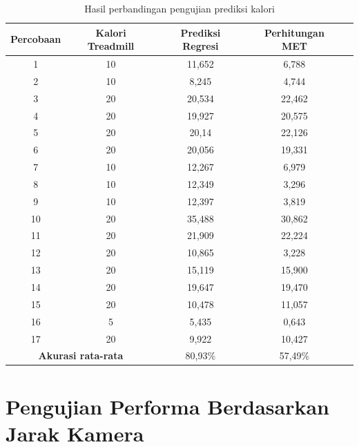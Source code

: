 \begin{longtable}{|c|c|c|c|c|}
  \caption{Hasil perbandingan pengujian prediksi kalori}
  \label{tb:PengujianPrediksi}                                   \\
  \hline
  \rowcolor[HTML]{C0C0C0}
  \textbf{Percobaan} & \textbf{Kalori Treadmill} & \textbf{Prediksi Regresi} & \textbf{Perhitungan MET} \\
  \hline
  1   & 10    & 11,652    & 6,788   \\
  \hline
  2   & 10    & 8,245     & 4,744   \\
  \hline
  3   & 20    & 20,534    & 22,462   \\
  \hline
  4   & 20    & 19,927    & 20,575   \\
  \hline
  5   & 20    & 20,14     & 22,126   \\
  \hline
  6   & 20    & 20,056    & 19,331   \\
  \hline
  7   & 10    & 12,267    & 6,979  \\
  \hline
  8   & 10    & 12,349    & 3,296  \\
  \hline
  9   & 10    & 12,397    & 3,819  \\
  \hline
  10   & 20   & 35,488    & 30,862  \\
  \hline
  11   & 20   & 21,909    & 22,224  \\
  \hline
  12   & 20   & 10,865    & 3,228  \\
  \hline
  13   & 20   & 15,119    & 15,900  \\
  \hline
  14   & 20   & 19,647    & 19,470  \\
  \hline
  15   & 20   & 10,478    & 11,057  \\
  \hline
  16   & 5    & 5,435     & 0,643  \\
  \hline
  17   & 20   & 9,922     & 10,427  \\
  \hline

  \multicolumn{2}{|c|}{\textbf{Akurasi rata-rata}} & 80,93\% & 57,49\% \\
  \hline
\end{longtable}


\section{Pengujian Performa Berdasarkan Jarak Kamera}
\label{sec:PengujianJarak}

